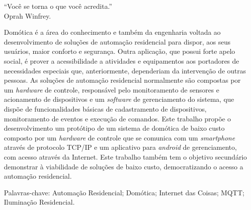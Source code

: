 \documentclass[
12pt,
openany, %
oneside, %
a4paper,			
english,			
brazil			        %
]{abntbibufjf}
\begin{document}
	\begin{epigrafe}
		\vspace*{\fill}
		\begin{flushright}
			``Você se torna o que você acredita.''\\
			Oprah Winfrey.
		\end{flushright}
	\end{epigrafe}

	
	
	\setlength{\absparsep}{18pt} 
	\begin{resumo}
	
	    Domótica é a área do conhecimento e também da engenharia voltada ao desenvolvimento de soluções de automação residencial para dispor, aos seus usuários, maior conforto e segurança. Outra aplicação, que possui forte apelo social, é prover a acessibilidade a atividades e equipamentos aos portadores de necessidades especiais que, anteriormente, dependeriam da intervenção de outras pessoas. As soluções de automação residencial normalmente são compostas por um \textit{hardware} de controle, responsável pelo monitoramento de sensores e acionamento de dispositivos e um \textit{software} de gerenciamento do sistema, que dispõe de funcionalidades básicas de cadastramento de dispositivos, monitoramento de eventos e execução de comandos. Este trabalho  propõe o desenvolvimento um protótipo de um sistema de domótica de baixo custo composto por um \textit{hardware} de controle que se comunica com um \textit{smartphone} através de protocolo TCP/IP e um aplicativo para \textit{android} de gerenciamento, com acesso através da Internet. Este trabalho também tem o objetivo secundário demonstrar à viabilidade de soluções de baixo custo, democratizando o acesso a automação residencial.
		
		
		Palavras-chave: Automação Residencial; Domótica; Internet das Coisas; MQTT; Iluminação Residencial.
		
	\end{resumo}
	
\end{document}
